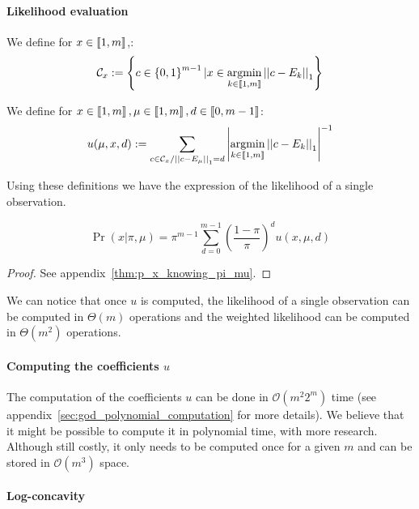 \paragraph{Likelihood evaluation}

\begin{definition}
    We define for $x \in \left\llbracket1, m\right\rrbracket$,:
\[ \mathcal{C}_x := \left\{ c \in \left\{ 0, 1 \right\}^{m-1} | x \in \operatorname*{argmin}_{k \in \left\llbracket1, m\right\rrbracket} \left|\left|c - E_k\right|\right|_1  \right\}\]
\end{definition}

\begin{definition}
    We define for $x \in \left\llbracket1, m\right\rrbracket, \mu \in \left\llbracket1, m\right\rrbracket, d \in \left\llbracket0, m-1\right\rrbracket$:
    \[ u(\mu, x, d) := \sum_{c \in \mathcal{C}_x / \left|\left|c - E_{\mu}\right|\right|_1 = d}  \left|\operatorname*{argmin}_{k \in \left\llbracket1, m\right\rrbracket} \left|\left|c - E_k\right|\right|_1\right|^{-1}\]
\end{definition}

Using these definitions we have the expression of the likelihood of a single observation.

\begin{thm}
    \label{thm:p_x_knowing_pi_mu}
    \[\Pr(x | \pi, \mu) = \pi^{m-1} \sum_{d = 0}^{m-1} \left(\frac{1 - \pi}{\pi}\right)^d u(x, \mu, d)\]
\end{thm}
\begin{proof}
    See appendix~\ref{thm:p_x_knowing_pi_mu}.
\end{proof}

We can notice that once $u$ is computed, the likelihood of a single observation can be computed in $\Theta(m)$ operations and the weighted likelihood can be computed in $\Theta(m^2)$ operations. 

\paragraph{Computing the coefficients $u$}

The computation of the coefficients $u$ can be done in $\mathcal O(m^2 2^m)$ time (see appendix~\ref{sec:god_polynomial_computation} for more details). We believe that it might be possible to compute it in polynomial time, with more research. Although still costly, it only needs to be computed once for a given $m$ and can be stored in $\mathcal O(m^3)$ space.

\paragraph{Log-concavity}

